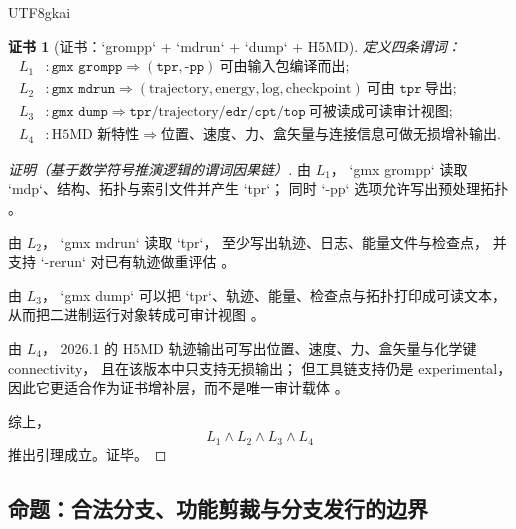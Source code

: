 \documentclass[12pt]{article}
\newtheorem{Certificate}{证书}[section]
\begin{document}
\begin{CJK*}{UTF8}{gkai}
\begin{Certificate}[证书：`grompp` + `mdrun` + `dump` + H5MD]
\label{cert:tex39-native-chain}
定义四条谓词：
\[
\begin{aligned}
  L_1 &: \texttt{gmx grompp}
  \Rightarrow
  (\texttt{tpr},\texttt{-pp})\ \text{可由输入包编译而出};\\
  L_2 &: \texttt{gmx mdrun}
  \Rightarrow
  (\text{trajectory},\text{energy},\text{log},\text{checkpoint})\ \text{可由 }\texttt{tpr}\ \text{导出};\\
  L_3 &: \texttt{gmx dump}
  \Rightarrow
  \texttt{tpr}/\text{trajectory}/\texttt{edr}/\texttt{cpt}/\texttt{top}\ \text{可被读成可读审计视图};\\
  L_4 &: \text{H5MD 新特性}
  \Rightarrow
  \text{位置、速度、力、盒矢量与连接信息可做无损增补输出}.
\end{aligned}
\]
\end{Certificate}

\begin{proof}[证明（基于数学符号推演逻辑的谓词因果链）]
由 $L_1$，
`gmx grompp` 读取 `mdp`、结构、拓扑与索引文件并产生 `tpr`；
同时 `-pp` 选项允许写出预处理拓扑
\cite{Gromacs2026Grompp}。

由 $L_2$，
`gmx mdrun` 读取 `tpr`，
至少写出轨迹、日志、能量文件与检查点，
并支持 `-rerun` 对已有轨迹做重评估
\cite{Gromacs2026Mdrun}。

由 $L_3$，
`gmx dump` 可以把 `tpr`、轨迹、能量、检查点与拓扑打印成可读文本，
从而把二进制运行对象转成可审计视图
\cite{Gromacs2026Dump}。

由 $L_4$，
2026.1 的 H5MD 轨迹输出可写出位置、速度、力、盒矢量与化学键 connectivity，
且在该版本中只支持无损输出；
但工具链支持仍是 experimental，
因此它更适合作为证书增补层，而不是唯一审计载体
\cite{Gromacs2026Features,Gromacs2026Validation}。

综上，
\[
  L_1\wedge L_2\wedge L_3\wedge L_4
\]
推出引理成立。证毕。
\end{proof}

\subsection{命题：合法分支、功能剪裁与分支发行的边界}
\label{subsec:tex39-ch2-proposition}


\end{CJK*}
\end{document}
